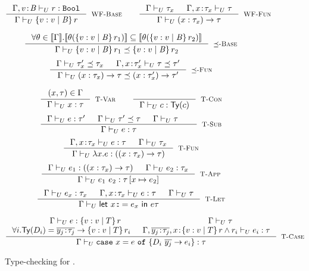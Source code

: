 \newcommand\restrictdecidable[2]{#2}
\begin{figure}[t!]
\centering
\captionsetup{justification=centering}

$$
\inference
   {\undechastype{\Gamma, \tbind{v}{\Base}}
                 {\restrictdecidable{p}{r}}{\tbool}
   }
   {\undeciswellformed{\Gamma}{\tref{v}{\Base}{}{\restrictdecidable{p}{r}}}}
   [\rwbase]
\qquad
\inference{
	\undeciswellformed{\Gamma}{\tau_x} &&
	\undeciswellformed{\Gamma, \tbind{x}{\tau_x}}{\tau}
}{
	\undeciswellformed{\Gamma}{\tfunref{x}{\tau_x}{\tau}{v}{e}}
}[\rwfun]
$$


$$
\inference{
  {\forall \sto\in \interp{\Env}. 
  		 \interp{\thetasub{\sto}{\tref{v}{\Base}{}{\restrictdecidable{p_1}{r_1}}}} 
  		\subseteq   \interp{\thetasub{\sto}{\tref{v}{\Base}{}{\restrictdecidable{p_2}{r_2}}}}}
}{
	\undecissubtype{\Gamma}
		{\tref{v}{\Base}{}{\restrictdecidable{p_1}{r_1}}}
		{\tref{v}{\Base}{}{\restrictdecidable{p_2}{r_2}}}
}[\rsubbase]
$$
$$
\inference{
	\undecissubtype{\Gamma}{\tau'_x}{\tau_x} &&
	\undecissubtype{\Gamma, \tbind{x}{\tau'_x}}{\tau}{\tau'}
}{
	\undecissubtype{\Gamma}{\tfunref{x}{\tau_x}{\tau}{v}{e_1}}{\tfunref{x}{\tau'_x}{\tau'}{v}{e_2}}
}[\rsubfun]
$$

$$
\inference{
	(x,\tau) \in \Gamma 
}{
	\undechastype{\Gamma}{x}{\tau}
}[\rtvar]
\qquad
\inference{
}{
	\undechastype{\Gamma}{c}{\constty{c}}
}[\rtconst]
$$
$$
\inference{
	\undechastype{\Gamma}{e}{\tau'} &&
	\undecissubtype{\Gamma}{\tau'}{\tau} &&
	\undeciswellformed{\Gamma}{\tau} &&
}{
	\undechastype{\Gamma}{e}{\tau}
}[\rtsub]
$$
$$
\inference{
	\undechastype{\Gamma, \tbind{x}{\tau_x}}{e}{\tau} &&
	\undeciswellformed{\Gamma}{\tau_x}
}{
	\undechastype{\Gamma}{\efun{x}{\tau_x}{e}}{(\tfun{x}{\tau_x}{\tau})}
}[\rtfun]
$$
$$
\inference{
	\undechastype{\Gamma}{e_1}{(\tfunref{x}{\tau_{x}}{\tau}{v}{e_v})} &&
	\undechastype{\Gamma}{\restrictdecidable{y}{e_2}}{\tau_{x}}
}{
	\undechastype{\Gamma}{\eapp{e_1}{\restrictdecidable{y}{e_2}}}{\tau\sub{x}{\restrictdecidable{y}{e_2}}}
}[\rtapp]
$$
$$
\inference{
	\undechastype{\Gamma}{e_x}{\tau_{x}} &&
	\undechastype{\Gamma,\tbind{x}{\tau_x}}{e}{\tau} &&
	\undeciswellformed{\Gamma}{\tau}
}{
	\undechastype{\Gamma}{\elet{x}{e_x}{e}}{\tau}
}[\rtlet]
$$

$$\inference{
	\undechastype{\Gamma}{e}{\tref{v}{T}{}{r}} &&
	 \undeciswellformed{\Gamma}{\tau}\\
     \forall i. \constty{D_i} = \overline{\tbind{y_j}{\tau_j}} \rightarrow \tref{v}{T}{}{r_i} &&
      \undechastype{\Gamma, \overline{\tbind{y_j}{\tau_j}}, \tbind{x}{\tref{v}{T}{}{r \land r_i}}}{e_i}{\tau}  \\
}{
	\undechastype{\Gamma}{\ecase{e}{D_i}{\overline{y_j}}{e_i}{x}}{\tau}
}[\rtcase]$$
\caption[Type checking of \undeclang.]{Type-checking for \undeclang.}
\label{fig:typing}
\end{figure}

